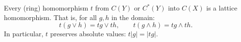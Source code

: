 Every (ring) homomorphism $t$ from $C(Y)$ or $C^*(Y)$ into $C(X)$ is a lattice homomorphism. That is, for all $g, h$ in the domain:
$$t(g \vee h) = tg \vee th, \qquad t(g \wedge h) = tg \wedge th.$$
In particular, $t$ preserves absolute values: $t|g| = |tg|$.
